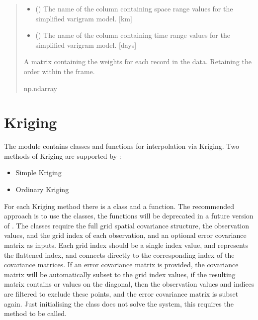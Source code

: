 \documentclass[letterpaper,10pt,english]{sphinxmanual}
\begin{document}
\begin{fulllineitems}
\begin{quote}
\begin{description}
\begin{itemize}
\item {}
\sphinxAtStartPar
{} () \textendash{} The name of the column containing space range values for the simplified
varigram model. {[}km{]}

\item {}
\sphinxAtStartPar
{} () \textendash{} The name of the column containing time range values for the simplified
varigram model. {[}days{]}

\end{itemize}

\sphinxAtStartPar
{} \textendash{} A matrix containing the weights for each record in the data.
Retaining the order within the frame.

\sphinxAtStartPar
np.ndarray

\end{description}\end{quote}

\end{fulllineitems}


\sphinxstepscope


\chapter{Kriging}
\label{\detokenize{kriging:kriging}}\label{\detokenize{kriging::doc}}
\sphinxAtStartPar
The  module contains classes and functions for interpolation via Kriging.
Two methods of Kriging are supported by :
\begin{itemize}
\item {}
\sphinxAtStartPar
Simple Kriging

\item {}
\sphinxAtStartPar
Ordinary Kriging

\end{itemize}

\sphinxAtStartPar
For each Kriging method there is a class and a function. The recommended approach is to use the
classes, the functions will be deprecated in a future version of . The classes
require the full grid spatial covariance structure, the observation values, and the grid index of
each observation, and an optional error covariance matrix as inputs. Each grid index should be a
single index value, and represents the flattened index, and connects directly to the corresponding
index of the covariance matrices. If an error covariance matrix is provided, the covariance matrix
will be automatically subset to the grid index values, if the resulting matrix contains  or 
values on the diagonal, then the observation values and indices are filtered to exclude these
points, and the error covariance matrix is subset again. Just initialising the class does not solve
the system, this requires the  method to be called.
\end{document}
